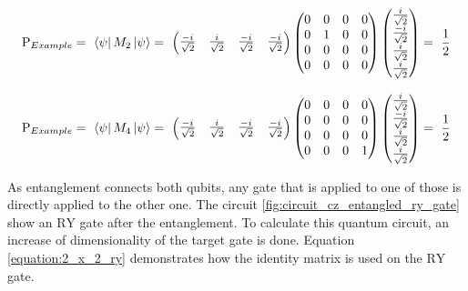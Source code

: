 \begin{equation}
    \centering
    \begin{split}
        \mathrm{P}_{Example} =\ \bra{\psi}M_2\ket{\psi} =\ \begin{pmatrix}
        \frac{-i}{\sqrt{2}} & \frac{i}{\sqrt{2}} & \frac{-i}{\sqrt{2}} & \frac{-i}{\sqrt{2}}
        \end{pmatrix}\begin{pmatrix}
        0 & 0 & 0 & 0 \\ 
        0 & 1 & 0 & 0 \\ 
        0 & 0 & 0 & 0\\ 
        0 & 0 & 0& 0\end{pmatrix}\begin{pmatrix}
        \frac{i}{\sqrt{2}} \\ \frac{-i}{\sqrt{2}} \\ \frac{i}{\sqrt{2}} \\ \frac{i}{\sqrt{2}}
        \end{pmatrix} =\ \frac{1}{2}
    \end{split}
    \label{equation:probability_calculation_example_1}
\end{equation}

\begin{equation}
    \centering
    \begin{split}
        \mathrm{P}_{Example} =\ \bra{\psi}M_4\ket{\psi} =\ \begin{pmatrix}
        \frac{-i}{\sqrt{2}} & \frac{i}{\sqrt{2}} & \frac{-i}{\sqrt{2}} & \frac{-i}{\sqrt{2}}
        \end{pmatrix}\begin{pmatrix}
        0 & 0 & 0 & 0 \\ 
        0 & 0 & 0 & 0 \\ 
        0 & 0 & 0 & 0\\ 
        0 & 0 & 0& 1\end{pmatrix}\begin{pmatrix}
        \frac{i}{\sqrt{2}} \\ \frac{-i}{\sqrt{2}} \\ \frac{i}{\sqrt{2}} \\ \frac{i}{\sqrt{2}}
        \end{pmatrix} =\ \frac{1}{2}
    \end{split}
    \label{equation:probability_calculation_example_2}
\end{equation}

As entanglement connects both qubits, any gate that is applied to one of those is directly applied to the other one. The circuit \ref{fig:circuit_cz_entangled_ry_gate} show an $\mathrm{RY}$ gate after the entanglement. To calculate this quantum circuit, an increase of dimensionality of the target gate is done. Equation \ref{equation:2_x_2_ry} demonstrates how the identity matrix is used on the $\mathrm{RY}$ gate.

